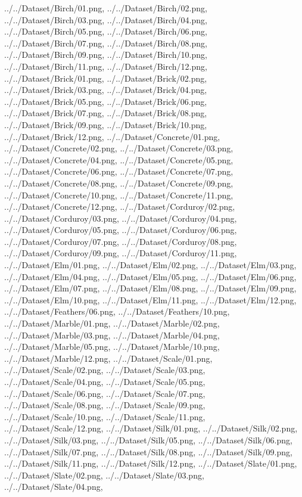 \documentclass[12pt,a4paper]{article}
\begin{document}
\begin{singlespace}
{../../Dataset/Birch/01.png,
../../Dataset/Birch/02.png,
../../Dataset/Birch/03.png,
../../Dataset/Birch/04.png,
../../Dataset/Birch/05.png,
../../Dataset/Birch/06.png,
../../Dataset/Birch/07.png,
../../Dataset/Birch/08.png,
../../Dataset/Birch/09.png,
../../Dataset/Birch/10.png,
../../Dataset/Birch/11.png,
../../Dataset/Birch/12.png,
../../Dataset/Brick/01.png,
../../Dataset/Brick/02.png,
../../Dataset/Brick/03.png,
../../Dataset/Brick/04.png,
../../Dataset/Brick/05.png,
../../Dataset/Brick/06.png,
../../Dataset/Brick/07.png,
../../Dataset/Brick/08.png,
../../Dataset/Brick/09.png,
../../Dataset/Brick/10.png,
../../Dataset/Brick/12.png,
../../Dataset/Concrete/01.png,
../../Dataset/Concrete/02.png,
../../Dataset/Concrete/03.png,
../../Dataset/Concrete/04.png,
../../Dataset/Concrete/05.png,
../../Dataset/Concrete/06.png,
../../Dataset/Concrete/07.png,
../../Dataset/Concrete/08.png,
../../Dataset/Concrete/09.png,
../../Dataset/Concrete/10.png,
../../Dataset/Concrete/11.png,
../../Dataset/Concrete/12.png,
../../Dataset/Corduroy/02.png,
../../Dataset/Corduroy/03.png,
../../Dataset/Corduroy/04.png,
../../Dataset/Corduroy/05.png,
../../Dataset/Corduroy/06.png,
../../Dataset/Corduroy/07.png,
../../Dataset/Corduroy/08.png,
../../Dataset/Corduroy/09.png,
../../Dataset/Corduroy/11.png,
../../Dataset/Elm/01.png,
../../Dataset/Elm/02.png,
../../Dataset/Elm/03.png,
../../Dataset/Elm/04.png,
../../Dataset/Elm/05.png,
../../Dataset/Elm/06.png,
../../Dataset/Elm/07.png,
../../Dataset/Elm/08.png,
../../Dataset/Elm/09.png,
../../Dataset/Elm/10.png,
../../Dataset/Elm/11.png,
../../Dataset/Elm/12.png,
../../Dataset/Feathers/06.png,
../../Dataset/Feathers/10.png,
../../Dataset/Marble/01.png,
../../Dataset/Marble/02.png,
../../Dataset/Marble/03.png,
../../Dataset/Marble/04.png,
../../Dataset/Marble/05.png,
../../Dataset/Marble/10.png,
../../Dataset/Marble/12.png,
../../Dataset/Scale/01.png,
../../Dataset/Scale/02.png,
../../Dataset/Scale/03.png,
../../Dataset/Scale/04.png,
../../Dataset/Scale/05.png,
../../Dataset/Scale/06.png,
../../Dataset/Scale/07.png,
../../Dataset/Scale/08.png,
../../Dataset/Scale/09.png,
../../Dataset/Scale/10.png,
../../Dataset/Scale/11.png,
../../Dataset/Scale/12.png,
../../Dataset/Silk/01.png,
../../Dataset/Silk/02.png,
../../Dataset/Silk/03.png,
../../Dataset/Silk/05.png,
../../Dataset/Silk/06.png,
../../Dataset/Silk/07.png,
../../Dataset/Silk/08.png,
../../Dataset/Silk/09.png,
../../Dataset/Silk/11.png,
../../Dataset/Silk/12.png,
../../Dataset/Slate/01.png,
../../Dataset/Slate/02.png,
../../Dataset/Slate/03.png,
../../Dataset/Slate/04.png,
}
\end{singlespace}
\end{document}
